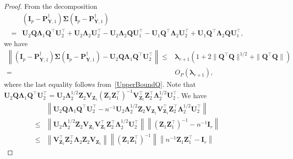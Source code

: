 \documentclass[12pt]{article} %
\newcommand{\bQ}{\mathbf{Q}}
\newcommand{\bZ}{\mathbf{Z}}
\newcommand{\bP}{\mathbf{P}}
\newcommand{\bY}{\mathbf{Y}}
\newcommand{\bI}{\mathbf{I}}
\newcommand{\bU}{\mathbf{U}}
\newcommand{\bV}{\mathbf{V}}
\newcommand{\bfsym}[1]{\ensuremath{\boldsymbol{#1}}}
\def\blambda {\bfsym {\lambda}}
\def\bLambda {\bfsym {\Lambda}}
\def\bSigma {\bfsym {\Sigma}}
\theoremstyle{definition}
\begin{document}
\begin{appendices}
\begin{proof}
         From the decomposition
         \begin{equation*}
             \begin{split}
         &(\bI_p-\bP_{\bY,1}^{\dagger})
         \bSigma 
         (\bI_p-\bP_{\bY,1}^{\dagger})
         \\
             =&
             \bU_2\bQ \bLambda_1 \bQ^\top \bU_2^\top 
             +\bU_2\bLambda_2  \bU_2^\top
             -\bU_2 \bLambda_2 \bQ \bU_1^\top
             -\bU_1 \bQ^\top \bLambda_2 \bU_2^\top
             +\bU_1 \bQ^\top \bLambda_2 \bQ \bU_1^\top,
             \end{split}
         \end{equation*}
         we have
         \begin{equation}\label{choc2}
             \begin{split}
         \left\|
         (\bI_p-\bP_{\bY,1}^{\dagger})
         \bSigma 
         (\bI_p-\bP_{\bY,1}^{\dagger})
             -
             \bU_2 \bQ \bLambda_1 \bQ^\top  \bU_2^\top
             \right\|
             \leq &
             \blambda_{r+1}(1+2\|\bQ^\top \bQ\|^{1/2}+\|\bQ^\top \bQ\|)
             \\
             = &
             O_P\left(\blambda_{r+1}\right)
             ,
             \end{split}
         \end{equation}
         where the last equality follows from~\eqref{UpperBoundQ}.
         Note that
         $
             \bU_2\bQ \bLambda_1 \bQ^\top\bU_2^\top
             =
             \bU_2 \bLambda_2^{1/2} \bZ_2 \bV_{\bZ_1} (\bZ_1 \bZ_1^\top)^{-1}\bV_{\bZ_1}^\top \bZ_2^\top \bLambda_2^{1/2} \bU_2^\top$. 
             We have
     \begin{equation} \label{choc6}
     \begin{split}
             &\left\|\bU_2\bQ \bLambda_1 \bQ^\top\bU_2^\top
             -
             n^{-1} \bU_2 \bLambda_2^{1/2} \bZ_2 \bV_{\bZ_1} \bV_{\bZ_1}^\top \bZ_2^\top \bLambda_2^{1/2} \bU_2^\top
             \right\|
             \\
             \leq&
             \left\|\bU_2 \bLambda_2^{1/2} \bZ_2 \bV_{\bZ_1}\bV_{\bZ_1}^\top \bZ_2^\top \bLambda_2^{1/2} \bU_2^\top\right\|
             \left\|(\bZ_1 \bZ_1^\top)^{-1} - n^{-1} \bI_r\right\|
                  \\
            \leq&
             \left\|\bV_{\bZ_1}^\top \bZ_2^\top \bLambda_2 \bZ_2 \bV_{\bZ_1}\right\|
                  \left\|(\bZ_1 \bZ_1^\top)^{-1}\right\|
                  \left\|n^{-1}\bZ_1 \bZ_1^\top -\bI_r\right\|

\end{split}
\end{equation}
\end{proof}
\end{appendices}
\end{document}
